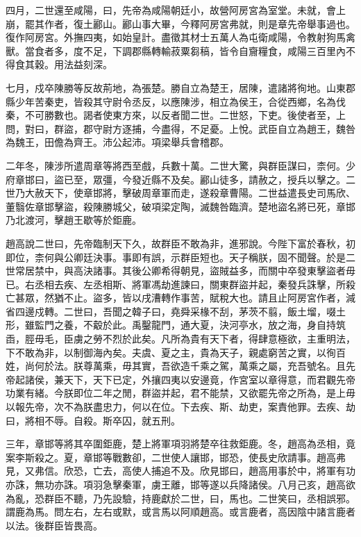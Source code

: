 四月，二世還至咸陽，曰，先帝為咸陽朝廷小，故營阿房宮為室堂。未就，會上崩，罷其作者，復土酈山。酈山事大畢，今釋阿房宮弗就，則是章先帝舉事過也。復作阿房宮。外撫四夷，如始皇計。盡徵其材士五萬人為屯衛咸陽，令教射狗馬禽獸。當食者多，度不足，下調郡縣轉輸菽粟芻稿，皆令自齎糧食，咸陽三百里內不得食其穀。用法益刻深。

七月，戍卒陳勝等反故荊地，為張楚。勝自立為楚王，居陳，遣諸將徇地。山東郡縣少年苦秦吏，皆殺其守尉令丞反，以應陳涉，相立為侯王，合從西鄉，名為伐秦，不可勝數也。謁者使東方來，以反者聞二世。二世怒，下吏。後使者至，上問，對曰，群盜，郡守尉方逐捕，今盡得，不足憂。上悅。武臣自立為趙王，魏咎為魏王，田儋為齊王。沛公起沛。項梁舉兵會稽郡。

二年冬，陳涉所遣周章等將西至戲，兵數十萬。二世大驚，與群臣謀曰，柰何。少府章邯曰，盜已至，眾彊，今發近縣不及矣。酈山徒多，請赦之，授兵以擊之。二世乃大赦天下，使章邯將，擊破周章軍而走，遂殺章曹陽。二世益遣長史司馬欣、董翳佐章邯擊盜，殺陳勝城父，破項梁定陶，滅魏咎臨濟。楚地盜名將已死，章邯乃北渡河，擊趙王歇等於鉅鹿。

趙高說二世曰，先帝臨制天下久，故群臣不敢為非，進邪說。今陛下富於春秋，初即位，柰何與公卿廷決事。事即有誤，示群臣短也。天子稱朕，固不聞聲。於是二世常居禁中，與高決諸事。其後公卿希得朝見，盜賊益多，而關中卒發東擊盜者毋已。右丞相去疾、左丞相斯、將軍馮劫進諫曰，關東群盜并起，秦發兵誅擊，所殺亡甚眾，然猶不止。盜多，皆以戌漕轉作事苦，賦稅大也。請且止阿房宮作者，減省四邊戍轉。二世曰，吾聞之韓子曰，堯舜采椽不刮，茅茨不翦，飯土塯，啜土形，雖監門之養，不觳於此。禹鑿龍門，通大夏，決河亭水，放之海，身自持筑臿，脛毋毛，臣虜之勞不烈於此矣。凡所為貴有天下者，得肆意極欲，主重明法，下不敢為非，以制御海內矣。夫虞、夏之主，貴為天子，親處窮苦之實，以徇百姓，尚何於法。朕尊萬乘，毋其實，吾欲造千乘之駕，萬乘之屬，充吾號名。且先帝起諸侯，兼天下，天下已定，外攘四夷以安邊竟，作宮室以章得意，而君觀先帝功業有緒。今朕即位二年之閒，群盜并起，君不能禁，又欲罷先帝之所為，是上毋以報先帝，次不為朕盡忠力，何以在位。下去疾、斯、劫吏，案責他罪。去疾、劫曰，將相不辱。自殺。斯卒囚，就五刑。

三年，章邯等將其卒圍鉅鹿，楚上將軍項羽將楚卒往救鉅鹿。冬，趙高為丞相，竟案李斯殺之。夏，章邯等戰數卻，二世使人讓邯，邯恐，使長史欣請事。趙高弗見，又弗信。欣恐，亡去，高使人捕追不及。欣見邯曰，趙高用事於中，將軍有功亦誅，無功亦誅。項羽急擊秦軍，虜王離，邯等遂以兵降諸侯。八月己亥，趙高欲為亂，恐群臣不聽，乃先設驗，持鹿獻於二世，曰，馬也。二世笑曰，丞相誤邪。謂鹿為馬。問左右，左右或默，或言馬以阿順趙高。或言鹿者，高因陰中諸言鹿者以法。後群臣皆畏高。


